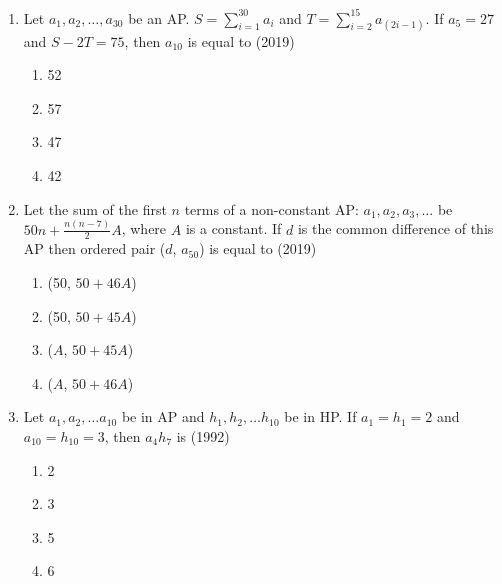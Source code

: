 \begin{enumerate}    [label=\thesubsection.\arabic*, ref=\thesubsection.\theenumi]
%    
    \hfill(2011)
%    
    \begin{multicols}{4}
\begin{enumerate}    
    \item$19$ months
    \item$20$ months
    \item$21$ months
    \item$18$ months
%
    \end{enumerate}
\end{multicols}
%
  \item Let $a_{1}, a_{2}, \dots, a_{30}$ be an AP. $S=\sum_{i=1}^{30}a_{i}$ and $T=\sum_{i=2}^{15}a_{(2i-1)}$. If $a_{5}=27$
	  and $S-2T=75$,  then $a_{10}$ is equal to \null \hfill{(2019)}
\begin{multicols}{4}
\begin{enumerate}    
  \item {52} \item{57}
  \item{47}
  \item{42}
  \end{enumerate}
\end{multicols}
  \item Let the sum of the first $n$ terms of a non-constant AP: $a_{1}, a_{2}, a_{3}, \dots $ be $50n + \frac{n(n-7)}{2}A$,  where $A$ is a constant. If $d$ is the common difference of this AP then ordered pair ($d$, $a_{50}$) is equal to \hfill{(2019)} 
	  \begin{multicols}{4}
\begin{enumerate}    
	\item {(50,  $50+46A$)} \item{(50,  $50+45A$)}
  \item{($A$,  $50+45A$)}
  \item{($A$,  $50+46A$)}
  \end{enumerate}
\end{multicols}
%
\item Let ${a_1, a_2, \dots a_{10}}$ be in AP and ${h_1, h_2,  \dots h_{10}}$ be in HP. If ${a_1}={h_1}=2$ and ${a_{10}}={h_{10}}=3$,  then ${a_4h_7}$ is \hfill(1992)
    \begin{multicols}{4}
\begin{enumerate}    
        \item 2
        \item 3
        \item 5
        \item 6
        \end{enumerate}

\end{multicols}
\end{enumerate}
